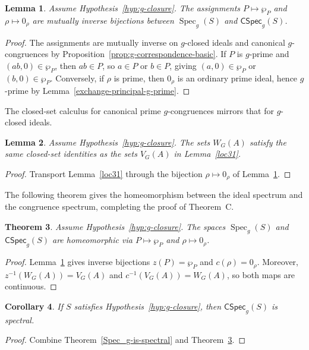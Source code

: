 \documentclass[11pt,leqno]{amsart}
\theoremstyle{plain}
\newtheorem{theorem}{Theorem}[section]
\newtheorem{lemma}[theorem]{Lemma}
\newtheorem{corollary}[theorem]{Corollary}
\theoremstyle{definition}
\theoremstyle{remark}
\numberwithin{equation}{section}
\DeclareMathOperator{\Spec}{Spec}
\newcommand{\GCSpec}{\mathsf{CSpec}_{g}}
\newcommand{\zero}[1]{0_{#1}}
\begin{document}
\begin{lemma}\label{loc30}
Assume Hypothesis~\ref{hyp:g-closure}.  The assignments
$P\mapsto\wp_P$ and $\rho\mapsto\zero\rho$ are mutually inverse
bijections between $\Spec_g(S)$ and $\GCSpec(S)$.
\end{lemma}
\begin{proof}
The assignments are mutually inverse on $g$-closed ideals and
canonical $g$-congruences by Proposition~\ref{prop:g-correspondence-basic}.
If $P$ is $g$-prime and $(ab,0)\in\wp_P$, then $ab\in P$,
so $a\in P$ or $b\in P$, giving $(a,0)\in\wp_P$ or $(b,0)\in\wp_P$.
Conversely, if $\rho$ is prime, then $\zero\rho$ is an ordinary prime
ideal, hence $g$-prime by Lemma~\ref{exchange-principal-g-prime}.
\end{proof}

The closed-set calculus for canonical prime $g$-congruences mirrors
that for $g$-closed ideals.

\begin{lemma}\label{loc38}
Assume Hypothesis~\ref{hyp:g-closure}.  The sets $W_G(A)$ satisfy
the same closed-set identities as the sets $V_G(A)$ in
Lemma~\ref{loc31}.
\end{lemma}
\begin{proof}
Transport Lemma~\ref{loc31} through the bijection
$\rho\mapsto\zero\rho$ of Lemma~\ref{loc30}.
\end{proof}

The following theorem gives the homeomorphism between the ideal
spectrum and the congruence spectrum, completing the proof of
Theorem~C.

\begin{theorem}\label{loc34}
Assume Hypothesis~\ref{hyp:g-closure}.  The spaces $\Spec_g(S)$
and $\GCSpec(S)$ are homeomorphic via $P\mapsto\wp_P$ and
$\rho\mapsto\zero\rho$.
\end{theorem}
\begin{proof}
Lemma~\ref{loc30} gives inverse bijections $z(P)=\wp_P$ and
$c(\rho)=\zero\rho$.  Moreover,
$z^{-1}(W_G(A))=V_G(A)$ and $c^{-1}(V_G(A))=W_G(A)$,
so both maps are continuous.
\end{proof}

\begin{corollary}\label{cor:gcong-spectral}
If $S$ satisfies Hypothesis~\ref{hyp:g-closure},
then $\GCSpec(S)$ is spectral.
\end{corollary}
\begin{proof}
Combine Theorem~\ref{Spec_g-is-spectral} and Theorem~\ref{loc34}.
\end{proof}
\end{document}
